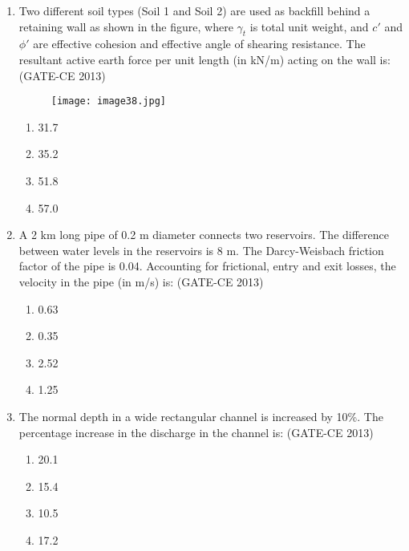 \documentclass[journal,12pt,onecolumn]{article}
\theoremstyle{remark}
\begin{document}
\begin{enumerate}
    \item Two different soil types (Soil 1 and Soil 2) are used as backfill behind a retaining wall as shown in the figure, where $\gamma_t$ is total unit weight, and $c'$ and $\phi'$ are effective cohesion and effective angle of shearing resistance. The resultant active earth force per unit length (in kN/m) acting on the wall is: (GATE-CE 2013)
    \begin{figure}[H]
    \centering
    \texttt{[image: image38.jpg]}  
    \caption{}
    \label{fig:8}
    \end{figure}
    \begin{multicols}{4}
    \begin{enumerate}
        \item 31.7 
        \item 35.2 
        \item 51.8 
        \item 57.0
    \end{enumerate}
    \end{multicols}
    
    \item A 2 km long pipe of 0.2 m diameter connects two reservoirs. The difference between water levels in the reservoirs is 8 m. The Darcy-Weisbach friction factor of the pipe is 0.04. Accounting for frictional, entry and exit losses, the velocity in the pipe (in m/s) is: (GATE-CE 2013)
    \begin{multicols}{4}
    \begin{enumerate}
        \item 0.63 
        \item 0.35 
        \item 2.52 
        \item 1.25
    \end{enumerate}
    \end{multicols}
    
    \item The normal depth in a wide rectangular channel is increased by 10\%. The percentage increase in the discharge in the channel is: (GATE-CE 2013)
    \begin{multicols}{4}
    \begin{enumerate}
        \item 20.1 
        \item 15.4 
        \item 10.5 
        \item 17.2
    \end{enumerate}
    \end{multicols}
    

\end{enumerate}
\end{document}
